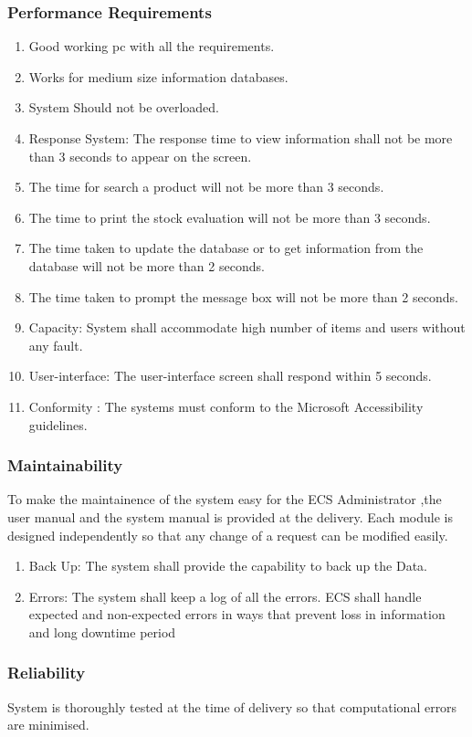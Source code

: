 \documentclass{article}
\begin{document}
\subsubsection{Performance Requirements}
\begin{enumerate}
\item Good working pc with all the requirements. 
\item  Works for medium size information databases. 
\item   System Should not be overloaded. 
\item  Response System:  The response time to view information shall not 
be more than 3 seconds to appear on the screen. 
\item The time for search a product  will not be more than 3 seconds. 
\item The time to print the stock evaluation will not be more than 3 
seconds. 
\item The time taken to update the database or to get information from 
the database will not be more than 2 seconds. 
\item  The time taken to prompt the message box will not be more than 2 
seconds. 
\item  Capacity:  System shall accommodate high number of items and 
users without any fault. 
\item User-interface:  The user-interface screen shall respond within 5 
seconds. 
\item  Conformity : The systems must conform to the Microsoft 
Accessibility guidelines. 
\end{enumerate}
\subsubsection{Maintainability}
To make the  maintainence of  the system easy for  the ECS
Administrator ,the user manual and the system manual is provided at
the delivery. Each module is designed independently so that any
change of a request can be modified easily.
\begin{enumerate}
\item  Back Up: The system shall provide the capability to back up the 
Data. 
\item  Errors: The system shall keep a log of all the errors. ECS  shall 
handle expected and non-expected errors in ways that prevent loss in 
information and long downtime period
\end{enumerate}
\subsubsection {Reliability}
System is thoroughly tested at the time of delivery so that
computational errors are minimised.
\end{document}

